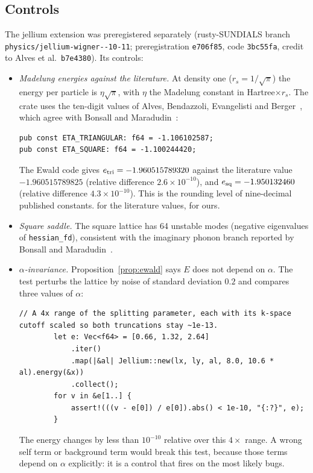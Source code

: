 \subsection{Controls}
The jellium extension was preregistered separately (rusty-SUNDIALS branch \texttt{physics/\allowbreak jellium-\allowbreak wigner--10-11};
preregistration \texttt{e706f85}, code \texttt{3bc55fa}, credit to Alves et al.\ \texttt{b7e4380}). Its controls:
\begin{itemize}
\item \emph{Madelung energies against the literature.} At density one ($r_s=1/\sqrt\pi$) the energy per particle is
$\eta\sqrt\pi$, with $\eta$ the Madelung constant in Hartree$\times r_s$. The crate uses the ten-digit values of Alves,
Bendazzoli, Evangelisti and Berger~\cite{alves}, which agree with Bonsall and Maradudin~\cite{bm}:
\begin{lstlisting}[language={},title={jellium.rs, lines 252--253}]
pub const ETA_TRIANGULAR: f64 = -1.106102587;
pub const ETA_SQUARE: f64 = -1.100244420;
\end{lstlisting}
The Ewald code gives $e_{\rm tri}=-1.960515789320$ against the literature value $-1.960515789825$ (relative difference
$2.6\times10^{-10}$), and $e_{\rm sq}=-1.950132460$ (relative difference $4.3\times10^{-10}$). This is the rounding level
of nine-decimal published constants. \tierL{} for the literature values, \tierX{} for ours.
\item \emph{Square saddle.} The square lattice has 64 unstable modes (negative eigenvalues of \texttt{hessian\_fd}),
consistent with the imaginary phonon branch reported by Bonsall and Maradudin~\cite{bm}.
\item \emph{$\alpha$-invariance.} Proposition~\ref{prop:ewald} says $E$ does not depend on $\alpha$. The test perturbs
the lattice by noise of standard deviation $0.2$ and compares three values of $\alpha$:
\begin{lstlisting}[language={},title={jellium.rs, lines 304--311}]
        // A 4x range of the splitting parameter, each with its k-space cutoff scaled so both truncations stay ~1e-13.
        let e: Vec<f64> = [0.66, 1.32, 2.64]
            .iter()
            .map(|&al| Jellium::new(lx, ly, al, 8.0, 10.6 * al).energy(&x))
            .collect();
        for v in &e[1..] {
            assert!(((v - e[0]) / e[0]).abs() < 1e-10, "{:?}", e);
        }
\end{lstlisting}
The energy changes by less than $10^{-10}$ relative over this $4\times$ range. A wrong self term or background term
would break this test, because those terms depend on $\alpha$ explicitly: it is a control that fires on the most
likely bugs.
\end{itemize}

